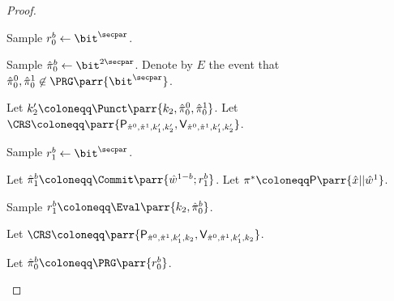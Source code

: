\begin{proof}
\begin{hybrids}
        \item Sample \(r_0^b \gets \bit^\secpar\).

        \item Sample \(\hat{\pi}_0^b \gets \bit^{2\secpar}\).
        Denote by \(E\) the event that \(\hat{\pi}_0^0, \hat{\pi}_0^1 \not\in \PRG\parr{\bit^\secpar}\).

        \item Let \(k'_2 \coloneqq \Punct\parr{k_2, \hat{\pi}_0^0, \hat{\pi}_0^1}\).
        Let \(\CRS \coloneqq \parr{\textsf{P}_{\hat{\pi}^0,\hat{\pi}^1,k'_1,k'_2}, \textsf{V}_{\hat{\pi}^0,\hat{\pi}^1,k'_1,k'_2}}\).

        \item Sample \(r_1^b \gets \bit^\secpar\).

        \item Let \(\hat{\pi}_1^b \coloneqq \Commit\parr{\hat{w}^{1-b}; r_1^b}\).
        Let \(\pi^* \coloneqq \textsf{P}\parr{\hat{x}||\hat{w}^1}\).

        \item Sample \(r_1^b \coloneqq \Eval\parr{k_2,\hat{\pi}_0^b}\).

        \item Let \(\CRS \coloneqq \parr{\textsf{P}_{\hat{\pi}^0,\hat{\pi}^1,k'_1,k_2}, \textsf{V}_{\hat{\pi}^0,\hat{\pi}^1,k'_1,k_2}}\).

        \item Let \(\hat{\pi}_0^b \coloneqq \PRG\parr{r_0^b}\).
        

\end{hybrids}
\end{proof}
